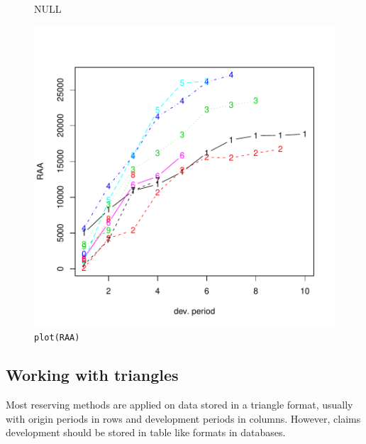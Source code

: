 \documentclass[a4paper]{article}
\begin{document}
\begin{figure}[h]
  \begin{center}
\begin{Schunk}
\begin{Soutput}
NULL
\end{Soutput}
\end{Schunk}
\includegraphics{ChainLadder-002}
    \caption{\texttt{plot(RAA)}}
  \end{center}
\end{figure}

\subsection{Working with triangles}
Most reserving methods are applied on data stored in a triangle format, usually with origin periods in rows and development periods in columns. However, claims development should be stored in table like formats in databases.
\end{document}
